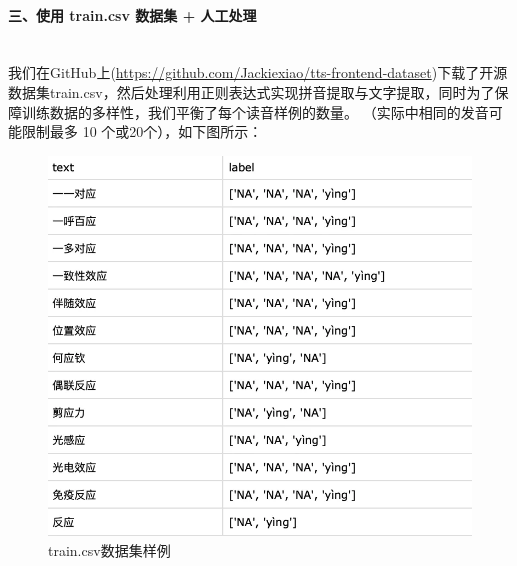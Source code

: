 \documentclass[12pt,hyperref,a4paper,UTF8]{ctexart}
\begin{document}
\paragraph{三、使用 train.csv 数据集 + 人工处理}\leavevmode\\
\indent 我们在GitHub上(\url{https://github.com/Jackiexiao/tts-frontend-dataset})下载了开源数据集train.csv，然后处理利用正则表达式实现拼音提取与文字提取，同时为了保障训练数据的多样性，我们平衡了每个读音样例的数量。 （实际中相同的发音可能限制最多 10 个或20个），如下图所示：
\begin{figure}[H]%
    \centering
    \includegraphics[width=0.5\linewidth]{figures/image2.png}
    \caption{train.csv数据集样例}
    \label{fig:enter-label}
\end{figure}
\end{document}
